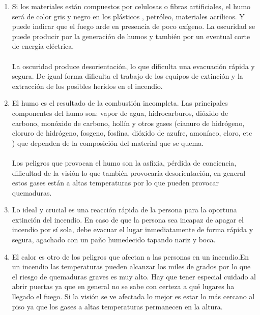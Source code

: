 \begin{enumerate}[resume]
  \item  Si los materiales están compuestos por celulosas o fibras artificiales, el humo será de color gris y negro en los plásticos , petróleo, materiales acrílicos. Y puede indicar que el fuego arde en presencia de poco oxígeno. La oscuridad se puede producir por la generación de humos y también por un eventual corte de energía eléctrica.\\ \\
  La oscuridad produce desorientación, lo que dificulta una evacuación rápida y segura. De igual forma dificulta el trabajo de los equipos de extinción y la extracción de los posibles heridos en el incendio. 
  
  \item El humo es el resultado de la combustión incompleta. Las principales componentes del humo son: vapor de agua, hidrocarburos, dióxido de carbono, monóxido de carbono, hollín y otros gases (cianuro de hidrógeno, cloruro de hidrógeno, fosgeno, fosfina, dióxido de azufre, amoníaco, cloro, etc ) que dependen de la composición del material que se quema. \\ \\
  Los peligros que provocan el humo son la asfixia, pérdida de conciencia, dificultad de la visión lo que también provocaría desorientación, en general estos gases están a altas temperaturas por lo que pueden provocar quemaduras.
  \item Lo ideal y crucial es una reacción rápida de la persona para la oportuna extinción del incendio. En caso de que la persona sea incapaz de apagar el incendio por sí sola, debe evacuar el lugar inmediatamente de forma rápida y segura, agachado con un paño humedecido tapando nariz y boca. 
  \item 
  El calor es otro de los peligros que afectan a las personas en un incendio.En un incendio las temperaturas pueden alcanzar los miles de grados por lo que el riesgo de quemaduras graves es muy alto. Hay que tener especial cuidado al abrir puertas ya que en general no se sabe con certeza a qué lugares ha llegado el fuego. Si la visión se ve afectada lo mejor es estar lo más cercano al piso ya que los gases a altas temperaturas permanecen en la altura.
\end{enumerate}

